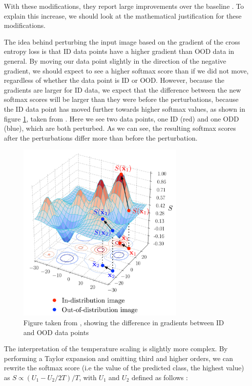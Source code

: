 \documentclass[UKenglish]{uiomasterthesis} %
\theoremstyle{definition}
\begin{document}
With these modifications, they report large improvements over the baseline \cite[4]{odin}. To explain this increase, we should look at the mathematical justification for these modifications.

The idea behind perturbing the input image based on the gradient of the cross entropy loss is that ID data points have a higher gradient than OOD data in general. By moving our data point slightly in the direction of the negative gradient, we should expect to see a higher softmax score than if we did not move, regardless of whether the data point is ID or OOD. However, because the gradients are larger for ID data, we expect that the difference between the new softmax scores will be larger than they were before the perturbations, because the ID data point has moved further towards higher softmax values, as shown in figure \ref{softmaxmove}, taken from \cite[8]{odin}. Here we see two data points, one ID (red) and one ODD (blue), which are both perturbed. As we can see, the resulting softmax scores after the perturbations differ more than before the perturbation.

\begin{figure}[h]
\centerline{\includegraphics[width=3.25in]{figure/gradient.png}}
\caption{Figure taken from \cite{odin}, showing the difference in gradients between ID and OOD data points}
\label{softmaxmove}
\end{figure}

The interpretation of the temperature scaling is slightly more complex. By performing a Taylor expansion and omitting third and higher orders, we can rewrite the softmax score (i.e the value of the predicted class, the highest value) as ${S\propto {(U_{1}-U_{2}/2T)/T}}$, with $U_1$ and $U_2$ defined as follows \cite[4]{odin}:
\end{document}
